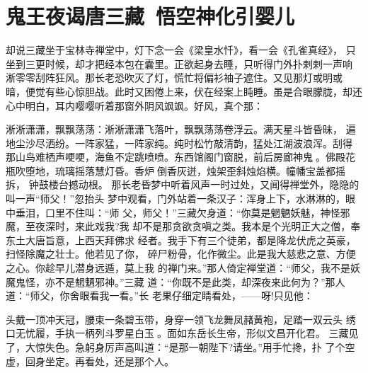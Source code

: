 \chapter{鬼王夜谒唐三藏~悟空神化引婴儿}

却说三藏坐于宝林寺禅堂中，灯下念一会《梁皇水忏》，看一会《孔雀真经》，
只坐到三更时候，却才把经本包在囊里。正欲起身去睡，只听得门外扑剌剌一声响
，淅零零刮阵狂风。那长老恐吹灭了灯，慌忙将偏衫袖子遮住。又见那灯或明或
暗，便觉有些心惊胆战。此时又困倦上来，伏在经案上盹睡。虽是合眼朦胧，却还
心中明白，耳内嘤嘤听着那窗外阴风飒飒。好风，真个那：

淅淅潇潇，飘飘荡荡：淅淅潇潇飞落叶，飘飘荡荡卷浮云。满天星斗皆昏昧，
遍地尘沙尽洒纷。一阵家猛，一阵家纯。纯时松竹敲清韵，猛处江湖波浪浑。刮得
那山鸟难栖声哽哽，海鱼不定跳喷喷。东西馆阁门窗脱，前后房廊神鬼。佛殿花
瓶吹堕地，琉璃摇落慧灯昏。香炉倒香灰迸，烛架歪斜烛焰横。幢幡宝盖都摇拆，
钟鼓楼台撼动根。
那长老昏梦中听着风声一时过处，又闻得禅堂外，隐隐的叫一声“师父！”忽抬头
梦中观看，门外站着一条汉子：浑身上下，水淋淋的，眼中垂泪，口里不住叫：“师
父，师父！”三藏欠身道：“你莫是魍魉妖魅，神怪邪魔，至夜深时，来此戏我?我
却不是那贪欲贪嗔之类。我本是个光明正大之僧，奉东土大唐旨意，上西天拜佛求
经者。我手下有三个徒弟，都是降龙伏虎之英豪，扫怪除魔之壮士。他若见了你，
碎尸粉骨，化作微尘。此是我大慈悲之意、方便之心。你趁早儿潜身远遁，莫上我
的禅门来。”那人倚定禅堂道：“师父，我不是妖魔鬼怪，亦不是魍魉邪神。”三藏
道：“你既不是此类，却深夜来此何为？”那人道：“师父，你舍眼看我一看。”长
老果仔细定睛看处，——呀!只见他：

头戴一顶冲天冠，腰束一条碧玉带，身穿一领飞龙舞凤赭黄袍，足踏一双云头
绣口无忧履，手执一柄列斗罗星白玉。面如东岳长生帝，形似文昌开化君。
三藏见了，大惊失色。急躬身厉声高叫道：“是那一朝陛下?请坐。”用手忙搀，扑
了个空虚，回身坐定。再看处，还是那个人。

